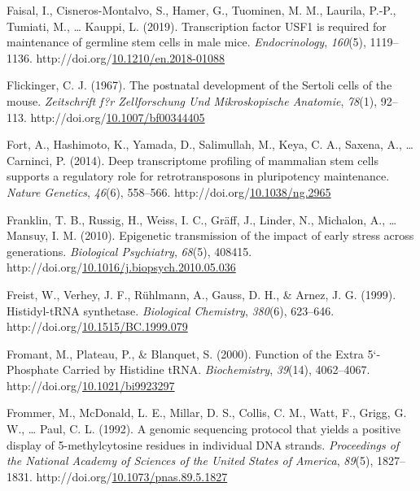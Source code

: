 \documentclass[12pt,twoside]{reedthesis}
\newlength{\cslhangindent}
\newenvironment{CSLReferences}[2] %
 {%
  \setlength{\parindent}{0pt}
  \ifodd #1 \everypar{\setlength{\hangindent}{\cslhangindent}}\ignorespaces\fi
  \ifnum #2 > 0
  \setlength{\parskip}{#2\baselineskip}
  \fi
 }%
 {}
\begin{document}
\begin{CSLReferences}{1}{0}
\leavevmode{}%
Faisal, I., Cisneros-Montalvo, S., Hamer, G., Tuominen, M. M., Laurila, P.-P., Tumiati, M., \ldots{} Kauppi, L. (2019). Transcription factor USF1 is required for maintenance of germline stem cells in male mice. \emph{Endocrinology}, \emph{160}(5), 1119--1136. http://doi.org/\href{https://doi.org/10.1210/en.2018-01088}{10.1210/en.2018-01088}

\leavevmode{}%
Flickinger, C. J. (1967). The postnatal development of the Sertoli cells of the mouse. \emph{Zeitschrift f?r Zellforschung Und Mikroskopische Anatomie}, \emph{78}(1), 92--113. http://doi.org/\href{https://doi.org/10.1007/bf00344405}{10.1007/bf00344405}

\leavevmode{}%
Fort, A., Hashimoto, K., Yamada, D., Salimullah, M., Keya, C. A., Saxena, A., \ldots{} Carninci, P. (2014). Deep transcriptome profiling of mammalian stem cells supports a regulatory role for retrotransposons in pluripotency maintenance. \emph{Nature Genetics}, \emph{46}(6), 558--566. http://doi.org/\href{https://doi.org/10.1038/ng.2965}{10.1038/ng.2965}

\leavevmode{}%
Franklin, T. B., Russig, H., Weiss, I. C., Gräff, J., Linder, N., Michalon, A., \ldots{} Mansuy, I. M. (2010). Epigenetic transmission of the impact of early stress across generations. \emph{Biological Psychiatry}, \emph{68}(5), 408415. http://doi.org/\href{https://doi.org/10.1016/j.biopsych.2010.05.036}{10.1016/j.biopsych.2010.05.036}

\leavevmode{}%
Freist, W., Verhey, J. F., Rühlmann, A., Gauss, D. H., \& Arnez, J. G. (1999). Histidyl-tRNA synthetase. \emph{Biological Chemistry}, \emph{380}(6), 623--646. http://doi.org/\href{https://doi.org/10.1515/BC.1999.079}{10.1515/BC.1999.079}

\leavevmode{}%
Fromant, M., Plateau, P., \& Blanquet, S. (2000). Function of the Extra 5{`}-Phosphate Carried by Histidine tRNA. \emph{Biochemistry}, \emph{39}(14), 4062--4067. http://doi.org/\href{https://doi.org/10.1021/bi9923297}{10.1021/bi9923297}

\leavevmode{}%
Frommer, M., McDonald, L. E., Millar, D. S., Collis, C. M., Watt, F., Grigg, G. W., \ldots{} Paul, C. L. (1992). A genomic sequencing protocol that yields a positive display of 5-methylcytosine residues in individual DNA strands. \emph{Proceedings of the National Academy of Sciences of the United States of America}, \emph{89}(5), 1827--1831. http://doi.org/\href{https://doi.org/10.1073/pnas.89.5.1827}{10.1073/pnas.89.5.1827}


\end{CSLReferences}
\end{document}

